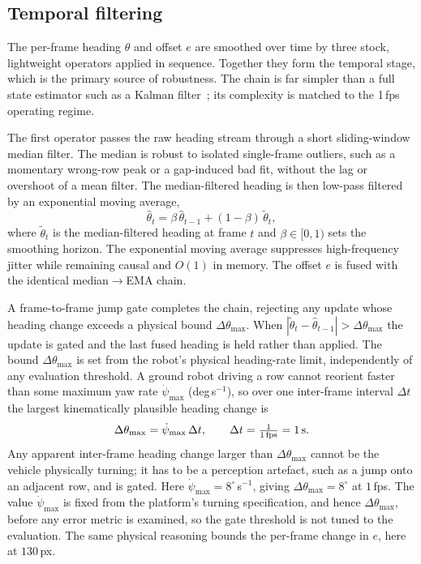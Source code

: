 \subsection{Temporal filtering}
\label{sec:method:fusion}

\noindent The per-frame heading $\theta$ and offset $e$ are smoothed over time by three stock,
lightweight operators applied in sequence. Together they form the temporal stage, which is the primary
source of robustness. The chain is far simpler than a full state estimator such as a Kalman
filter~\cite{kalman1960}; its complexity is matched to the 1\,fps operating regime.

The first operator passes the raw heading stream through a short sliding-window median filter. The median is
robust to isolated single-frame outliers, such as a momentary wrong-row peak or a gap-induced bad fit,
without the lag or overshoot of a mean filter. The median-filtered heading is then low-pass filtered by an
exponential moving average,
\begin{equation}
\label{eq:ema}
\hat\theta_t = \beta\,\hat\theta_{t-1} + (1-\beta)\,\tilde\theta_t ,
\end{equation}
where $\tilde\theta_t$ is the median-filtered heading at frame $t$ and $\beta\in[0,1)$ sets the smoothing
horizon. The exponential moving average suppresses high-frequency jitter while remaining causal and $O(1)$ in
memory. The offset $e$ is fused with the identical median$\rightarrow$EMA chain.

A frame-to-frame jump gate completes the chain, rejecting any update whose heading change exceeds a physical
bound $\Delta\theta_{\max}$. When $|\tilde\theta_t - \hat\theta_{t-1}| > \Delta\theta_{\max}$ the update is
gated and the last fused heading is held rather than applied. The bound $\Delta\theta_{\max}$ is set from the
robot's physical heading-rate limit, independently of any evaluation threshold. A ground robot driving a row
cannot reorient faster than some maximum yaw rate $\dot\psi_{\max}$ (deg\,s$^{-1}$), so over one inter-frame
interval $\Delta t$ the largest kinematically plausible heading change is
\begin{equation}
\label{eq:jumpgate}
\Delta\theta_{\max} = \dot\psi_{\max}\,\Delta t ,
\qquad \Delta t = \tfrac{1}{\text{1\,fps}} = 1\,\text{s}.
\end{equation}
Any apparent inter-frame heading change larger than $\Delta\theta_{\max}$ cannot be the vehicle physically
turning; it has to be a perception artefact, such as a jump onto an adjacent row, and is gated. Here
$\dot\psi_{\max}=8^\circ$\,s$^{-1}$, giving $\Delta\theta_{\max}=8^\circ$ at $1$\,fps. The value
$\dot\psi_{\max}$ is fixed from the platform's turning specification, and hence $\Delta\theta_{\max}$, before
any error metric is examined, so the gate threshold is not tuned to the evaluation. The same physical
reasoning bounds the per-frame change in $e$, here at $130$\,px.

